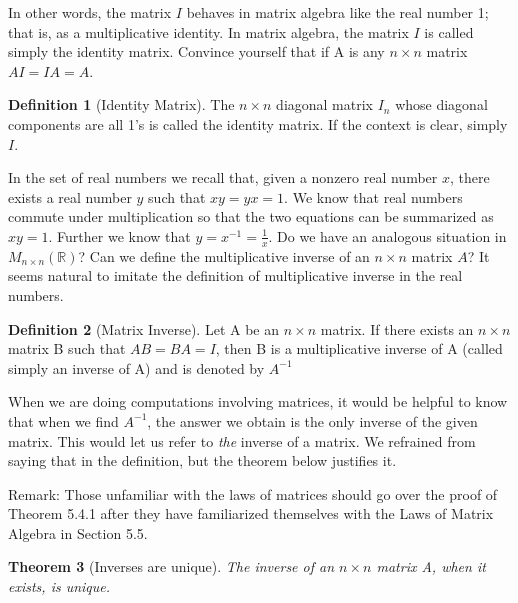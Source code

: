 \documentclass[10pt,]{book}
\theoremstyle{plain}
\newtheorem{theorem}{Theorem}[section]
\theoremstyle{definition}
\newtheorem{definition}[theorem]{Definition}
\theoremstyle{definition}
\theoremstyle{definition}
\theoremstyle{definition}
\begin{document}
\par
In other words, the matrix \(I\) behaves in matrix algebra like the real number 1; that is, as a multiplicative identity. In matrix algebra, the matrix \(I\) is called simply the identity matrix. Convince yourself that if A is any \(n\times n\) matrix \(A I = I A = A\).%
\begin{definition}[Identity Matrix]\label{def-identity-matrix}
\label{notation-2}
The \(n\times n\) diagonal matrix \(I_n\) whose 
diagonal components are all 1's is called the identity matrix.  If the context is clear, simply \(I\).%
\end{definition}
\par
In the set of real numbers we recall that, given a nonzero real number \(x\), there exists a real number \(y\) such that \(x y = y x
=1\). We know that real numbers commute under multiplication so that the two equations can be summarized as \(x y = 1\). Further we know that \(y =x^{-1}= \frac{1}{x}\). Do we have an analogous situation in \(M_{n\times n}(\mathbb{R})\)? Can we define the multiplicative inverse of an \(n\times n\) matrix \(A\)? It seems natural to imitate the definition of multiplicative inverse in the real numbers.%
\begin{definition}[Matrix Inverse]\label{def-matrix-inverse}
\label{notation-3}
Let A be an \(n\times n\) matrix. If there exists 
an \(n\times n\) matrix B such that \(A B = B A =I\), then B is a multiplicative inverse of A (called simply an inverse of A) and is denoted by \(A^{-1}\)%
\end{definition}
\par
When we are doing computations involving matrices, it would be helpful to know that when we find \(A^{-1}\), the answer we 
obtain is the only inverse of the given matrix.  This would let us refer to \emph{the} inverse of a matrix.  We refrained from saying that in the definition, but the theorem below justifies it. %
\par
Remark: Those unfamiliar with the laws of matrices should go over the proof of Theorem 5.4.1 after they have familiarized themselves with the Laws of Matrix Algebra in Section 5.5.%
\begin{theorem}[Inverses are unique]\label{theorem-unique-inverse}
The inverse of an \(n\times n\) matrix A, when it exists, is unique.%
\end{theorem}
\end{document}
